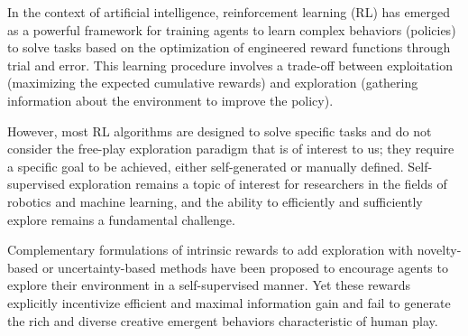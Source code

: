 


\newpage
In the context of artificial intelligence, reinforcement learning (RL) has emerged as a powerful framework for training agents to learn complex behaviors (policies) to solve tasks based on the optimization of engineered reward functions through trial and error.
This learning procedure involves a trade-off between exploitation (maximizing the expected cumulative rewards) and exploration (gathering information about the environment to improve the policy).

However, most RL algorithms are designed to solve specific tasks and do not consider the free-play exploration paradigm that is of interest to us; they require a specific goal to be achieved, either self-generated or manually defined.
Self-supervised exploration remains a topic of interest for researchers in the fields of robotics and machine learning, and the ability to efficiently and sufficiently explore remains a fundamental challenge.

Complementary formulations of intrinsic rewards to add exploration \citep{exploration_survey} with novelty-based \citep{burda2018largescale,novel_explore} or uncertainty-based \citep{rnd,plan_explore,disagreement} methods have been proposed to encourage agents to explore their environment in a self-supervised manner. 
Yet these rewards explicitly incentivize efficient and maximal information gain and fail to generate the rich and diverse creative emergent behaviors characteristic of human play.

